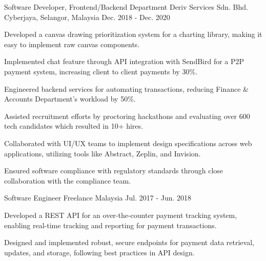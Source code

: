 \begin{cventries}
  \cventry
    {Software Developer, Frontend/Backend Department} %
    {Deriv Services Sdn. Bhd.} %
    {Cyberjaya, Selangor, Malaysia} %
    {Dec. 2018 - Dec. 2020} %
    {
      \begin{cvitems} %
        \item {Developed a canvas drawing prioritization system for a charting library, making it easy to implement raw canvas components.}
        \item {Implemented chat feature through API integration with SendBird for a P2P payment system, increasing client to client payments by 30\%.}
        \item {Engineered backend services for automating transactions, reducing Finance \& Accounts Department's workload by 50\%.}
        \item {Assisted recruitment efforts by proctoring hackathons and evaluating over 600 tech candidates which resulted in 10+ hires.}
        \item {Collaborated with UI/UX teams to implement design specifications across web applications, utilizing tools like Abstract, Zeplin, and Invision.}
        \item {Ensured software compliance with regulatory standards through close collaboration with the compliance team.}
      \end{cvitems}
    }

  \cventry
    {Software Engineer} %
    {Freelance} %
    {Malaysia} %
    {Jul. 2017 - Jun. 2018} %
    {
      \begin{cvitems} %
        \item {Developed a REST API for an over-the-counter payment tracking system, enabling real-time tracking and reporting for payment transactions.}
        \item {Designed and implemented robust, secure endpoints for payment data retrieval, updates, and storage, following best practices in API design.}
      \end{cvitems}
    }
\end{cventries}

